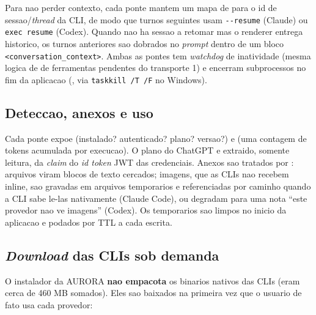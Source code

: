 Para nao perder contexto, cada ponte mantem um mapa de
 para o id de sessao/\emph{thread} da CLI, de modo que
turnos seguintes usam \lstinline|--resume| (Claude) ou \lstinline|exec resume|
(Codex). Quando nao ha sessao a retomar mas o renderer entrega historico, os
turnos anteriores sao dobrados no \emph{prompt} dentro de um bloco
\lstinline|<conversation_context>|. Ambas as pontes tem \emph{watchdog} de
inatividade (mesma logica de  de ferramentas pendentes do
transporte 1) e encerram subprocessos no fim da aplicacao
(, via \lstinline|taskkill /T /F| no Windows).

\subsection{Deteccao, anexos e uso}

Cada ponte expoe  (instalado? autenticado? plano? versao?) e
 (uma contagem de tokens acumulada por execucao). O plano do
ChatGPT e extraido, somente leitura, da \emph{claim} 
do \emph{id token} JWT das credenciais. Anexos sao tratados por
: arquivos viram blocos de texto cercados; imagens,
que as CLIs nao recebem inline, sao gravadas em arquivos temporarios e
referenciadas por caminho quando a CLI sabe le-las nativamente (Claude Code), ou
degradam para uma nota \enquote{este provedor nao ve imagens} (Codex). Os
temporarios sao limpos no inicio da aplicacao e podados por TTL a cada escrita.

\subsection{\emph{Download} das CLIs sob demanda}

O instalador da AURORA \textbf{nao empacota} os binarios nativos das CLIs
(eram cerca de 460 MB somados). Eles sao baixados na primeira vez que o usuario
de fato usa cada provedor:


